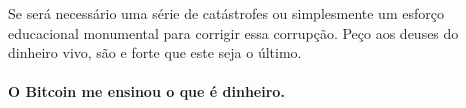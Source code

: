 Se será necessário uma série de catástrofes ou simplesmente um esforço educacional monumental para 
corrigir essa corrupção. Peço aos deuses do dinheiro vivo, são e forte que este seja o último.


\paragraph{O Bitcoin me ensinou o que é dinheiro.}

%
%
%
%
